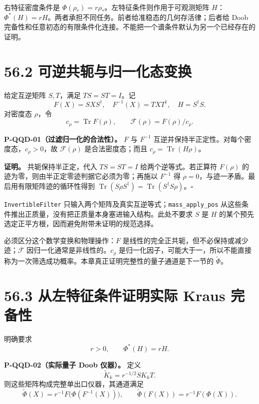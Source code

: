 \documentclass[
  11pt,
  oneside]{book}
\begin{document}
右特征密度条件是 \(\Phi(\rho_*)=r\rho_*\)。左特征条件则作用于可观测矩阵
\(H\)：\(\Phi^*(H)=rH\)。两者承担不同任务。前者给准稳态的几何存活律；后者给
Doob
完备性和任意初态的有限条件化连接。不能把一个谱条件默认为另一个已经存在的证明。

\section{56.2 可逆共轭与归一化态变换}

给定互逆矩阵 \(S,T\)，满足 \(TS=ST=I\)。记 \[
F(X)=SXS^\dagger,\quad F^{-1}(X)=TXT^\dagger,
\quad H=S^\dagger S.
\] 对密度态 \(\rho\)，令 \[
c_\rho=\operatorname{Tr}F(\rho),\qquad
\mathcal F(\rho)=F(\rho)/c_\rho.
\]

\protect\hypertarget{p-qqd-01}{}{}

\textbf{P-QQD-01（过滤归一化的合法性）。} \(F\) 与 \(F^{-1}\)
互逆并保持半正定性。对每个密度态，\(c_\rho>0\)，故 \(\mathcal F(\rho)\)
是合法密度态；而且 \(c_\rho=\operatorname{Tr}(H\rho)\)。

\textbf{证明。} 共轭保持半正定，代入 \(TS=ST=I\) 给两个逆等式。若正算符
\(F(\rho)\) 的迹为零，则由半正定零迹判据它必须为零；再施以 \(F^{-1}\) 得
\(\rho=0\)，与迹一矛盾。最后用有限矩阵迹的循环性得到
\(\operatorname{Tr}(S\rho S^\dagger)=\operatorname{Tr}(S^\dagger S\rho)\)。\(\square\)

\texttt{Invertible\allowbreak Filter}
只输入两个矩阵及真实互逆等式；\texttt{mass\_\allowbreak apply\_\allowbreak pos}
从这些条件推出正质量，没有把正质量本身塞进输入结构。此处不要求 \(S\) 是
\(H\) 的某个预先选定正平方根，因而避免附带未证明的规范选择。

必须区分这个数学变换和物理操作：\(F\)
是线性的完全正共轭，但不必保持或减少迹；\(\mathcal F\)
因归一化通常是非线性的。\(c_\rho\)
是归一化因子，可能大于一，所以不能直接称为一次筛选成功概率。本章真正证明完整性的量子通道是下一节的
\(\widetilde\Phi\)。

\section{56.3 从左特征条件证明实际 Kraus 完备性}

明确要求 \[
r>0,\qquad \Phi^*(H)=rH.
\]

\protect\hypertarget{p-qqd-02}{}{}

\textbf{P-QQD-02（实际量子 Doob 仪器）。} 定义 \[
\widetilde K_k=r^{-1/2}SK_kT.
\] 则这些矩阵构成完整单出口仪器，其通道满足 \[
\widetilde\Phi(X)=r^{-1}F\bigl(\Phi(F^{-1}(X))\bigr),
\qquad \widetilde\Phi(F(X))=r^{-1}F(\Phi(X)).
\]
\end{document}
